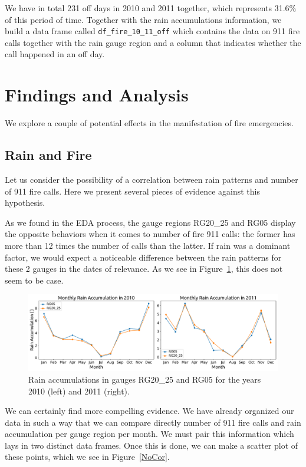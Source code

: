 \documentclass[12pt,a4paper]{article}
\begin{document}
We have in total 231 off days in 2010 and 2011 together, which represents 31.6\% of this period of time. Together with the rain accumulations information, we build a data frame called \verb|df_fire_10_11_off| which contains the data on 911 fire calls together with the rain gauge region and a column that indicates whether the call happened in an off day.

\section{Findings and Analysis}

We explore a couple of potential effects in the manifestation of fire emergencies.

\subsection{Rain and Fire}

Let us consider the possibility of a correlation between rain patterns and number of 911 fire calls. Here we present several pieces of evidence against this hypothesis.

As we found in the EDA process, the gauge regions RG20\_25 and RG05 display the opposite behaviors when it comes to number of fire 911 calls: the former has more than 12 times the number of calls than the latter. If rain was a dominant factor, we would expect a noticeable difference between the rain patterns for these 2 gauges in the dates of relevance. As we see in Figure~\ref{TwoPlots}, this does not seem to be case.

\begin{figure}[ht!]
\centering
\includegraphics[width=\textwidth]{figs/TwoPlots.pdf}
\caption{Rain accumulations in gauges RG20\_25 and RG05 for the years 2010 (left) and 2011 (right).}
\label{TwoPlots}
\end{figure}

We can certainly find more compelling evidence. We have already organized our data in such a way that we can compare directly number of 911 fire calls and rain accumulation per gauge region per month. We must pair this information which lays in two distinct data frames. Once this is done, we can make a scatter plot of these points, which we see in Figure~\ref{NoCor}.
\end{document}
